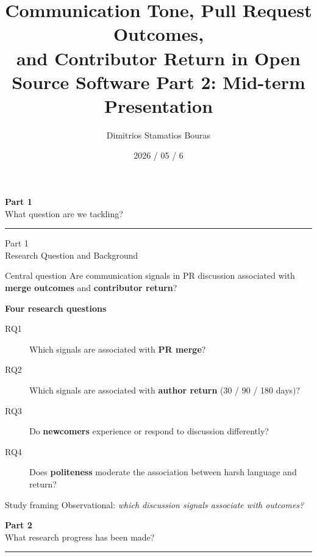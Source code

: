 \documentclass[aspectratio=169,11pt]{beamer}
\title[PR Communication Tone]{Communication Tone, Pull Request Outcomes,\\and Contributor Return in Open Source Software
\newline
Part 2: Mid-term Presentation}
\author[D.S Bouras]{Dimitrios Stamatios Bouras}
\institute{Quantitative Analysis of Open Source Software
\newline
Student Number: 2501112125}
\date{2026 / 05 / 6}
\begin{document}
\begin{frame}
\titlepage
\end{frame}

\begin{frame}
\vfill
\begin{center}
  {\Large\bfseries\color{accentblue} Part 1}\\[0.5em]
  {\large What question are we tackling?}\\[0.3em]
  {\color{darkblue}\rule{0.55\textwidth}{0.6pt}}
\end{center}
\vfill
\end{frame}

\begin{frame}{Part 1\\Research Question and Background}

\begin{block}{Central question}
Are communication signals in PR discussion associated with
\textbf{merge outcomes} and \textbf{contributor return}?
\end{block}

\vspace{0.2em}
\textbf{Four research questions}
\begin{description}
  \item[RQ1] Which signals are associated with \textbf{PR merge}?
  \item[RQ2] Which signals are associated with \textbf{author return} (30 / 90 / 180 days)?
  \item[RQ3] Do \textbf{newcomers} experience or respond to discussion differently?
  \item[RQ4] Does \textbf{politeness} moderate the association between harsh language and return?
\end{description}

\vspace{0.2em}
\begin{alertblock}{Study framing}
Observational: \emph{which discussion signals associate with outcomes?}
\end{alertblock}

\end{frame}

\begin{frame}
\vfill
\begin{center}
  {\Large\bfseries\color{accentblue} Part 2}\\[0.5em]
  {\large What research progress has been made?}\\[0.3em]
  {\color{darkblue}\rule{0.55\textwidth}{0.6pt}}
\end{center}
\vfill
\end{frame}
\end{document}
